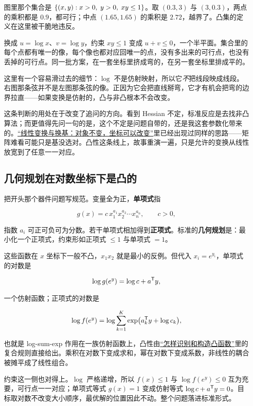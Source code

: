 图里那个集合是 \(\left\{(x,y):x>0,\;y>0,\;xy\le1\right\}\)。取 \((0.3,3)\) 与 \((3,0.3)\)，两点的乘积都是 \(0.9\)，都可行；中点 \((1.65,1.65)\) 的乘积是 \(2.72\)，越界了。凸集的定义在这里被干脆地违反。

换成 \(u=\log x\)、\(v=\log y\)，约束 \(xy\le1\) 变成 \(u+v\le0\)，一个半平面。集合里的每个点都有唯一的像，每个像也都对应回唯一的点，没有多出来的可行点，也没有丢掉的可行点。同一批方案，在一套坐标里挤成弯的，在另一套坐标里排成平的。

这里有一个容易滑过去的细节：\(\log\) 不是仿射映射，所以它\emph{不}把线段映成线段。右图那条弦并不是左图那条弦的像。正因为它会把直线掰弯，它才有机会把弯的边界拉直——如果变换是仿射的，凸与非凸根本不会改变。

这条判断的用处在于改变了追问的方向。看到 Hessian 不定，标准反应是去找非凸算法；而更值得先问一句的是，这个不定是问题自带的，还是我这套参数化带来的。\hyperref[sec:03-Linear-Algebra/02-Vector-Spaces/04]{``线性变换与换基：对象不变，坐标可以改变''}里已经出现过同样的思路——矩阵难看可能只是基没选对。凸性这条线上，故事重演一遍，只是允许的变换从线性放宽到了任意一一对应。

\subsection{几何规划在对数坐标下是凸的}

把开头那个器件问题写规范。变量全为正，\textbf{单项式}指

\[
g(x)=c\,x_1^{a_1}x_2^{a_2}\cdots x_n^{a_n},\qquad c>0,
\]

指数 \(a_i\) 可正可负可为分数。若干单项式相加得到\textbf{正项式}。标准的\textbf{几何规划}是：最小化一个正项式，约束形如正项式 \(\le1\) 与单项式 \(=1\)。

这些函数在 \(x\) 坐标下一般不凸，\(x_1x_2\) 就是最小的反例。但代入 \(x_i=e^{y_i}\)，单项式的对数是

\[
\log g(e^y)=\log c+a^{\mathsf{T}}y,
\]

一个仿射函数；正项式的对数是

\[
\log f(e^y)=\log\sum_{k=1}^{K}\exp\bigl(a_k^{\mathsf{T}}y+\log c_k\bigr),
\]

也就是 log-sum-exp 作用在一族仿射函数上，凸性由\hyperref[sec:09-Convex-Optimization/03-Convex-Functions/04]{``怎样识别和构造凸函数''}里的复合规则直接给出。乘积在对数下变成求和，幂在对数下变成系数，非线性的耦合被摊平成了线性组合。

约束这一侧也对得上。\(\log\) 严格递增，所以 \(f(x)\le1\) 与 \(\log f(e^y)\le0\) 互为充要，可行点一一对应；单项式等式 \(g(x)=1\) 变成仿射等式 \(\log c+a^{\mathsf{T}}y=0\)。目标取对数不改变大小顺序，最优解的位置因此不动。整个问题落进标准形式。

